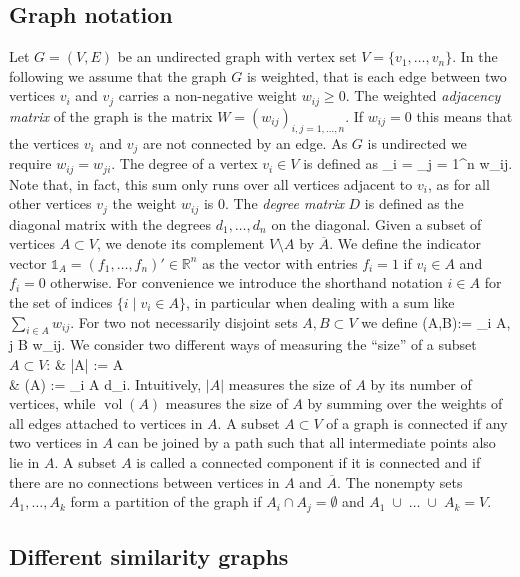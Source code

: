 \documentclass{article}
\def\ba#1\ea{\begin{align*}#1\end{align*}} %
\newcommand{\RR}{\mathbb{R}}
\newcommand{\R}{\RR}
\DeclareMathOperator{\vol}{vol} %
\newcommand{\charfct}{\mathbb{1}}
\newcommand{\union}{\;\cup\;}
\renewcommand{\bar}{\overline} %
\begin{document}
%
\subsection{Graph notation}
%



Let $G = (V,E)$ be an undirected graph with vertex
set $V = \{v_1, \hdots, v_n\}$.
%
In the following we assume that the graph $G$ is weighted, that is
each edge between two vertices $v_i$ and $v_j$ carries a non-negative weight $w_{ij} \geq
0$. 
%
The weighted {\em adjacency matrix} of the graph is the matrix $W = (w_{ij})_{i,j =
  1,\hdots,n}$. If $w_{ij} = 0$ this means that the vertices $v_i$ and
$v_j$ are not connected by an edge. As $G$ is undirected we require $w_{ij} = w_{ji}$. 
%
%
The degree of a vertex $v_i \in V$ is defined as 
\ba
d_i = \sum_{j = 1}^n w_{ij}.
\ea
Note that, in fact, this sum only runs over all vertices adjacent to $v_i$, as
for all other vertices $v_j$ the weight $w_{ij}$ is 0. The {\em degree matrix} $D$
is defined as the diagonal matrix with the degrees $d_1,\hdots,d_n$ on the diagonal.
%
Given a subset of vertices $A \subset V$, we denote its complement $V
\setminus A$ by $\bar A$.  We define the indicator vector $\charfct_A
= (f_1, \hdots, f_n)' \in \R^n$ as the vector with entries $f_i = 1$
if $v_i \in A$ and $f_i = 0$ otherwise. For convenience we introduce
the shorthand notation ${i\in A}$ for the set of indices $\{i \;| \;
v_i \in A\}$, in particular when dealing with a sum like $\sum_{i \in
  A} w_{ij}$.  For two not necessarily disjoint sets $A,B \subset V$ we
define 
%
\ba
W(A,B):= \sum_{i \in A, j \in B} w_{ij}.
\ea
%
 We consider two different ways of measuring the ``size'' of a
subset $A \subset V$:
%
\ba 
& |A| :=  A \\
& \vol(A) := \sum_{i \in A} d_i. 
\ea 
%
Intuitively, $|A|$  measures the size of $A$ by its number of
vertices, while $\vol(A)$ measures the size of $A$ by summing over the weights
of all edges attached to vertices in $A$. 
%
A subset $A \subset V$ of a graph is connected if any two vertices in
$A$ can be joined by a path such that all intermediate points also lie
in $A$. A subset $A$ is called a connected component if it is
connected and if there are no connections between vertices in $A$ and
$\bar A$. The nonempty sets $A_1, \hdots, A_k$ form a partition of the
graph if $A_i \cap A_j = \emptyset$ and $A_1 \union \hdots \union A_k
= V$.


%
  \subsection{Different similarity graphs} \label{ssec-sim-graphs}
%
\end{document}
